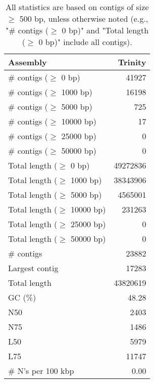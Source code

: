 \documentclass[12pt,a4paper]{article}
\begin{document}
\begin{table}[ht]
\begin{center}
\caption{All statistics are based on contigs of size $\geq$ 500 bp, unless otherwise noted (e.g., "\# contigs ($\geq$ 0 bp)" and "Total length ($\geq$ 0 bp)" include all contigs).}
\begin{tabular}{|l*{1}{|r}|}
\hline
Assembly & Trinity \\ \hline
\# contigs ($\geq$ 0 bp) & 41927 \\ \hline
\# contigs ($\geq$ 1000 bp) & 16198 \\ \hline
\# contigs ($\geq$ 5000 bp) & 725 \\ \hline
\# contigs ($\geq$ 10000 bp) & 17 \\ \hline
\# contigs ($\geq$ 25000 bp) & 0 \\ \hline
\# contigs ($\geq$ 50000 bp) & 0 \\ \hline
Total length ($\geq$ 0 bp) & 49272836 \\ \hline
Total length ($\geq$ 1000 bp) & 38343906 \\ \hline
Total length ($\geq$ 5000 bp) & 4565001 \\ \hline
Total length ($\geq$ 10000 bp) & 231263 \\ \hline
Total length ($\geq$ 25000 bp) & 0 \\ \hline
Total length ($\geq$ 50000 bp) & 0 \\ \hline
\# contigs & 23882 \\ \hline
Largest contig & 17283 \\ \hline
Total length & 43820619 \\ \hline
GC (\%) & 48.28 \\ \hline
N50 & 2403 \\ \hline
N75 & 1486 \\ \hline
L50 & 5979 \\ \hline
L75 & 11747 \\ \hline
\# N's per 100 kbp & 0.00 \\ \hline
\end{tabular}
\end{center}
\end{table}
\end{document}
